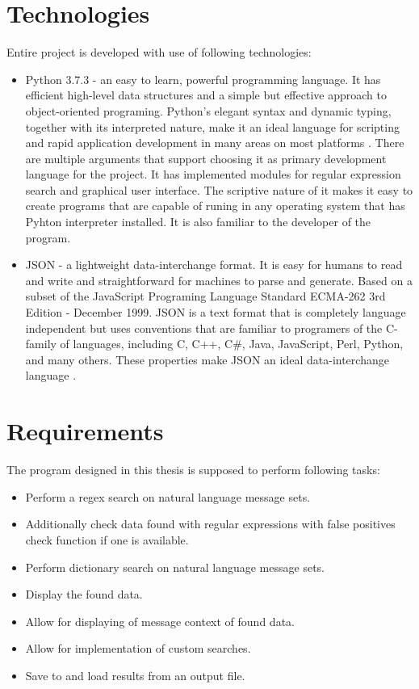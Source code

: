 \documentclass[a4paper,twoside,12pt]{book}
\begin{document}
\section{Technologies}
Entire project is developed with use of following technologies:
\begin{itemize}
   \item Python 3.7.3 - an easy to learn, powerful programming language. It has efficient high-level data structures 
   and a simple but effective approach to object-oriented programing. Python’s elegant syntax and dynamic typing, together with its interpreted nature, make it 
   an ideal language for scripting and rapid application development in many areas on most platforms \cite{bib:bookPython}. There are multiple arguments that support
   choosing it as primary development language for the project. It has implemented modules for regular expression search and graphical user interface.
   The scriptive nature of it makes it easy to create programs that are capable of runing in any operating system that has Pyhton interpreter installed.
   It is also familiar to the developer of the program.
   \item JSON - a lightweight data-interchange format. It is easy for humans to read and write and straightforward for machines to parse and generate. Based on a
   subset of the JavaScript Programing Language Standard ECMA-262 3rd Edition - December 1999. JSON is a text format that is completely language independent but
   uses conventions that are familiar to programers of the C-family of languages, including C, C++, C\#, Java, JavaScript, Perl, Python, and many others. These
   properties make JSON an ideal data-interchange language \cite{bib:internetJSON}.
\end{itemize}

\section{Requirements}

The program designed in this thesis is supposed to perform following tasks:
\begin{itemize}
   \item Perform a regex search on natural language message sets.
   \item Additionally check data found with regular expressions with false positives check function if one is available.
   \item Perform dictionary search on natural language message sets.
   \item Display the found data.
   \item Allow for displaying of message context of found data.
   \item Allow for implementation of custom searches.
   \item Save to and load results from an output file.
\end{itemize}
\end{document}
